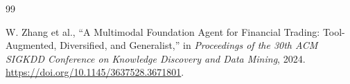 \documentclass[12pt,a4paper,oneside]{report}
\begin{document}








\begin{thebibliography}{99}


W. Zhang et al.,
``A Multimodal Foundation Agent for Financial Trading:
Tool-Augmented, Diversified, and Generalist,''
in \textit{Proceedings of the 30th ACM SIGKDD Conference
on Knowledge Discovery and Data Mining}, 2024.
\url{https://doi.org/10.1145/3637528.3671801}.

\end{thebibliography}
\end{document}
